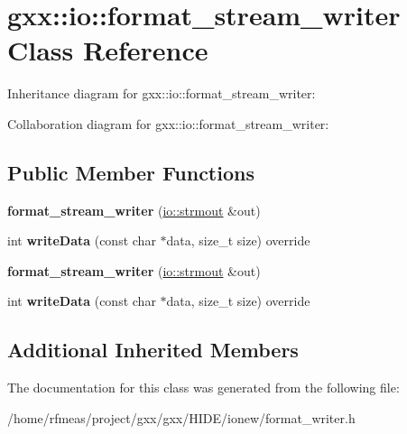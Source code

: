 \hypertarget{classgxx_1_1io_1_1format__stream__writer}{}\section{gxx\+:\+:io\+:\+:format\+\_\+stream\+\_\+writer Class Reference}
\label{classgxx_1_1io_1_1format__stream__writer}


Inheritance diagram for gxx\+:\+:io\+:\+:format\+\_\+stream\+\_\+writer\+:


Collaboration diagram for gxx\+:\+:io\+:\+:format\+\_\+stream\+\_\+writer\+:
\subsection*{Public Member Functions}
\begin{DoxyCompactItemize}
\item 
{\bfseries format\+\_\+stream\+\_\+writer} (\hyperlink{classgxx_1_1io_1_1strmout}{io\+::strmout} \&out)\hypertarget{classgxx_1_1io_1_1format__stream__writer_a94e92bf90829e6b205dc5d88eedbccc5}{}\label{classgxx_1_1io_1_1format__stream__writer_a94e92bf90829e6b205dc5d88eedbccc5}

\item 
int {\bfseries write\+Data} (const char $\ast$data, size\+\_\+t size) override\hypertarget{classgxx_1_1io_1_1format__stream__writer_a11c3402a07b72739982a97b82009c28f}{}\label{classgxx_1_1io_1_1format__stream__writer_a11c3402a07b72739982a97b82009c28f}

\item 
{\bfseries format\+\_\+stream\+\_\+writer} (\hyperlink{classgxx_1_1io_1_1strmout}{io\+::strmout} \&out)\hypertarget{classgxx_1_1io_1_1format__stream__writer_a94e92bf90829e6b205dc5d88eedbccc5}{}\label{classgxx_1_1io_1_1format__stream__writer_a94e92bf90829e6b205dc5d88eedbccc5}

\item 
int {\bfseries write\+Data} (const char $\ast$data, size\+\_\+t size) override\hypertarget{classgxx_1_1io_1_1format__stream__writer_a11c3402a07b72739982a97b82009c28f}{}\label{classgxx_1_1io_1_1format__stream__writer_a11c3402a07b72739982a97b82009c28f}

\end{DoxyCompactItemize}
\subsection*{Additional Inherited Members}


The documentation for this class was generated from the following file\+:\begin{DoxyCompactItemize}
\item 
/home/rfmeas/project/gxx/gxx/\+H\+I\+D\+E/ionew/format\+\_\+writer.\+h\end{DoxyCompactItemize}
